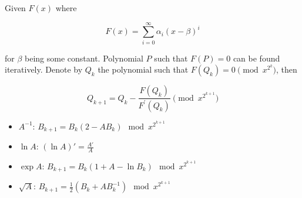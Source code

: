 Given $F(x)$ where

$$ F(x) = \sum_{i=0}^{\infty}{\alpha_i(x - \beta)^i} $$

for $\beta$ being some constant. Polynomial $P$ such that $F(P) = 0$ can be found iteratively. Denote by $Q_k$ the polynomial such that $F(Q_k) = 0 \pmod {x^{2^k}}$, then

$$ Q_{k+1} = Q_k - \frac{F(Q_k)}{F^\prime(Q_k)} \pmod {x^{2^{k+1}}} $$

\begin{itemize}
    \item $A^{-1}$: $B_{k+1} = B_k(2-AB_k) \mod x^{2^{k+1}}$
    \item $\ln A$: $(\ln A)' = \frac{A'}{A}$
    \item $\exp A$: $B_{k+1} = B_k(1 + A - \ln B_k) \mod x^{2^{k+1}}$
    \item $\sqrt A$: $B_{k+1} = \frac 1 2 (B_k + AB_k^{-1}) \mod x^{2^{k+1}}$
\end{itemize}
